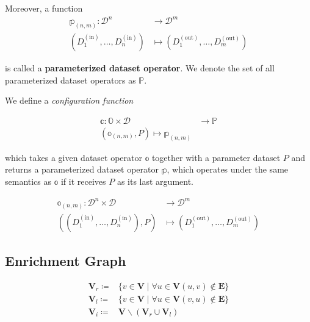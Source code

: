 Moreover, a function
\begin{equation}
\begin{aligned}
\mathbb{p}_{(n,m)}\colon \mathcal{D}^n &\to \mathcal{D}^m \\
\left(D_{1}^{(\text{in})}, \dots, D_{n}^{(\text{in})}\right) & \mapsto \left( D_{1}^{(\text{out})}, \dots, D_{m}^{(\text{out})} \right)
\end{aligned}
\end{equation}

is called a \textbf{parameterized dataset operator}. We denote the set of all parameterized dataset operators as $\mathbb{P}$.

We define a \emph{configuration function} 

\begin{equation}
\begin{aligned}
\mathbb{c}\colon \mathbb{O} \times \mathcal{D} &\to \mathbb{P} \\
 \left( \mathbb{o}_{(n,m)}, P \right) \mapsto \mathbb{p}_{(n,m)}
\end{aligned}
\label{eq:cfg}
\end{equation}

which takes a given dataset operator $\mathbb{o}$ together with a parameter dataset $P$ and returns a parameterized dataset operator $\mathbb{p}$, which operates under the same semantics as $\mathbb{o}$ if it receives $P$ as its last argument.

\begin{align*}
\mathbb{o}_{(n,m)}\colon \mathcal{D}^n \times  \mathcal{D}  &\to \mathcal{D}^m \\
\left(\left(D_{1}^{(\text{in})}, \dots, D_{n}^{(\text{in})}\right), P\right) & \mapsto \left( D_{1}^{(\text{out})}, \dots, D_{m}^{(\text{out})} \right)
\end{align*}

\subsection{Enrichment Graph}
\label{ssec:enrichmentgraph}

\begin{align}
  \mathbf{V}_r \coloneq & \{v \in \mathbf{V} \mid \forall u \in \mathbf{V} (u, v) \notin \mathbf{E}\} \label{eq:vr} \\
  \mathbf{V}_l \coloneq & \{v \in \mathbf{V} \mid \forall u \in \mathbf{V} (v, u) \notin \mathbf{E}\} \label{eq:vl} \\
  \mathbf{V}_i \coloneq & \mathbf{V}
  \backslash (\mathbf{V}_r \cup \mathbf{V}_l) \label{eq:vi}
\end{align}

